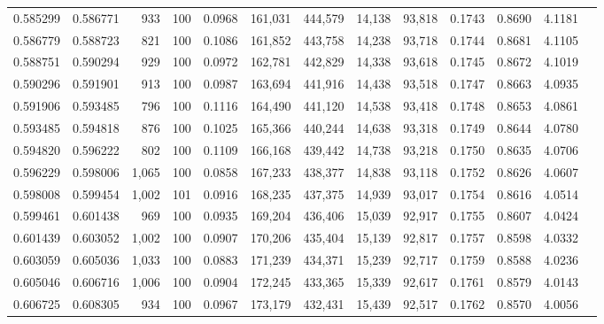 \begin{tabular}{rrrrrrrrrrrrr}
0.585299 & 0.586771 &   933 & 100 &                                     0.0968 & 161,031 & 444,579 &  14,138 &  93,818 & 0.1743 & 0.8690 & 4.1181 \\
0.586779 & 0.588723 &   821 & 100 &                                     0.1086 & 161,852 & 443,758 &  14,238 &  93,718 & 0.1744 & 0.8681 & 4.1105 \\
0.588751 & 0.590294 &   929 & 100 &                                     0.0972 & 162,781 & 442,829 &  14,338 &  93,618 & 0.1745 & 0.8672 & 4.1019 \\
0.590296 & 0.591901 &   913 & 100 &                                     0.0987 & 163,694 & 441,916 &  14,438 &  93,518 & 0.1747 & 0.8663 & 4.0935 \\
0.591906 & 0.593485 &   796 & 100 &                                     0.1116 & 164,490 & 441,120 &  14,538 &  93,418 & 0.1748 & 0.8653 & 4.0861 \\
0.593485 & 0.594818 &   876 & 100 &                                     0.1025 & 165,366 & 440,244 &  14,638 &  93,318 & 0.1749 & 0.8644 & 4.0780 \\
0.594820 & 0.596222 &   802 & 100 &                                     0.1109 & 166,168 & 439,442 &  14,738 &  93,218 & 0.1750 & 0.8635 & 4.0706 \\
0.596229 & 0.598006 & 1,065 & 100 &                                     0.0858 & 167,233 & 438,377 &  14,838 &  93,118 & 0.1752 & 0.8626 & 4.0607 \\
0.598008 & 0.599454 & 1,002 & 101 &                                     0.0916 & 168,235 & 437,375 &  14,939 &  93,017 & 0.1754 & 0.8616 & 4.0514 \\
0.599461 & 0.601438 &   969 & 100 &                                     0.0935 & 169,204 & 436,406 &  15,039 &  92,917 & 0.1755 & 0.8607 & 4.0424 \\
0.601439 & 0.603052 & 1,002 & 100 &                                     0.0907 & 170,206 & 435,404 &  15,139 &  92,817 & 0.1757 & 0.8598 & 4.0332 \\
0.603059 & 0.605036 & 1,033 & 100 &                                     0.0883 & 171,239 & 434,371 &  15,239 &  92,717 & 0.1759 & 0.8588 & 4.0236 \\
0.605046 & 0.606716 & 1,006 & 100 &                                     0.0904 & 172,245 & 433,365 &  15,339 &  92,617 & 0.1761 & 0.8579 & 4.0143 \\
0.606725 & 0.608305 &   934 & 100 &                                     0.0967 & 173,179 & 432,431 &  15,439 &  92,517 & 0.1762 & 0.8570 & 4.0056 \\

\end{tabular}
